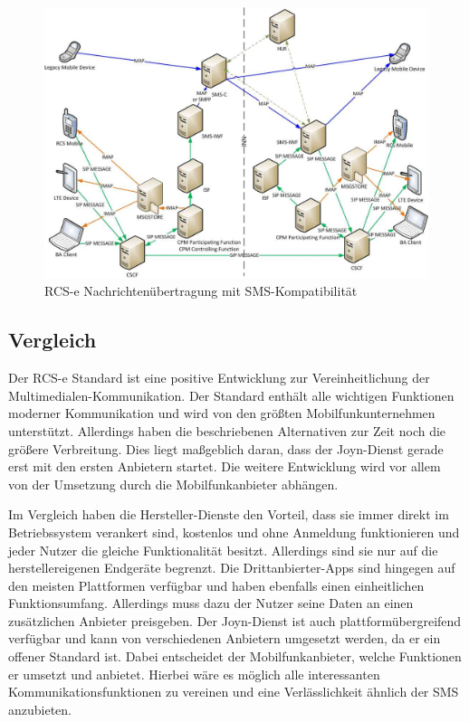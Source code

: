 \documentclass[german,12pt,a4paper]{article}
\begin{document}
 \begin{figure}
     \centering
     \includegraphics[width=\textwidth]{img/rcs-e-sms}
     \caption{RCS-e Nachrichtenübertragung mit SMS-Kompatibilität \cite{rcs:spec}}
     \label{fig:rcs-e-sms}
 \end{figure}



 \subsection{Vergleich} %
 \label{sub:vergleich}

    Der RCS-e Standard ist eine positive Entwicklung zur Vereinheitlichung der
    Multimedialen-Kommunikation. Der Standard enthält alle wichtigen Funktionen moderner
    Kommunikation und wird von den größten Mobilfunkunternehmen unterstützt. Allerdings
    haben die beschriebenen Alternativen zur Zeit noch die größere Verbreitung. Dies liegt
    maßgeblich daran, dass der Joyn-Dienst gerade erst mit den ersten Anbietern startet. Die
    weitere Entwicklung wird vor allem von der Umsetzung durch die Mobilfunkanbieter
    abhängen.

    Im Vergleich haben die Hersteller-Dienste den Vorteil, dass sie immer direkt im Betriebssystem
    verankert sind, kostenlos und ohne Anmeldung funktionieren und jeder Nutzer die gleiche
    Funktionalität besitzt. Allerdings sind sie nur auf die herstellereigenen Endgeräte begrenzt.
    Die Drittanbierter-Apps sind hingegen auf den meisten Plattformen verfügbar und haben ebenfalls
    einen einheitlichen Funktionsumfang. Allerdings muss dazu der Nutzer seine Daten an einen
    zusätzlichen Anbieter preisgeben. Der Joyn-Dienst ist auch plattformübergreifend verfügbar und
    kann von verschiedenen Anbietern umgesetzt werden, da er ein offener Standard ist.  Dabei
    entscheidet der Mobilfunkanbieter, welche Funktionen er umsetzt und anbietet. Hierbei wäre es
    möglich alle interessanten Kommunikationsfunktionen zu vereinen und eine Verlässlichkeit ähnlich
    der SMS anzubieten.
\end{document}
